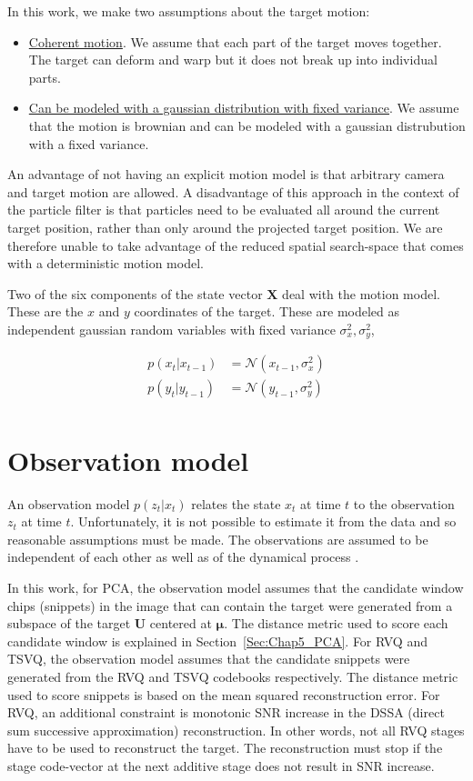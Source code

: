 In this work, we make two assumptions about the target motion:

\begin{itemize}
\item \underline{Coherent motion}.  We assume that each part of the target moves together.  The target can deform and warp but it does not break up into individual parts.
\item \underline{Can be modeled with a gaussian distribution with fixed variance}.  We assume that the motion is brownian and can be modeled with a gaussian distrubution with a fixed variance.  
\end{itemize}

An advantage of not having an explicit motion model is that arbitrary camera and target motion are allowed.  A disadvantage of this approach in the context of the particle filter is that particles need to be evaluated all around the current target position, rather than only around the projected target position.  We are therefore unable to take advantage of the reduced spatial search-space that comes with a deterministic motion model.  

Two of the six components of the state vector $\mathbf{X}$ deal with the motion model.  These are the $x$ and $y$ coordinates of the target.  These are modeled as independent gaussian random variables with fixed variance $\sigma_x^2, \sigma_y^2$,

\begin{align*}
p(x_t|x_{t-1}) &= \mathcal{N}(x_{t-1}, \sigma_x^2) \\
p(y_t|y_{t-1}) &= \mathcal{N}(y_{t-1}, \sigma_y^2) \\
\end{align*}

\section{Observation model}
An observation model $p(z_t|x_t)$ relates the state $x_t$ at time $t$ to the observation $z_t$ at time $t$.  Unfortunately, it is not possible to estimate it from the data and so reasonable assumptions must be made.  The observations are assumed to be independent of each other as well as of the dynamical process \cite{1998_JNL_Condensation_IsardBlake}. 

In this work, for PCA, the observation model assumes that the candidate window chips (snippets) in the image that can contain the target were generated from a subspace of the target $\mathbf{U}$ centered at $\mathbf{\mu}$.  The distance metric used to score each candidate window is explained in Section~\ref{Sec:Chap5_PCA}.  For RVQ and TSVQ, the observation model assumes that the candidate snippets were generated from the RVQ and TSVQ codebooks respectively.  The distance metric used to score snippets is based on the mean squared reconstruction error.  For RVQ, an additional constraint is monotonic SNR increase in the DSSA (direct sum successive approximation) reconstruction.  In other words, not all RVQ stages have to be used to reconstruct the target.  The reconstruction must stop if the stage code-vector at the next additive stage does not result in SNR increase.


